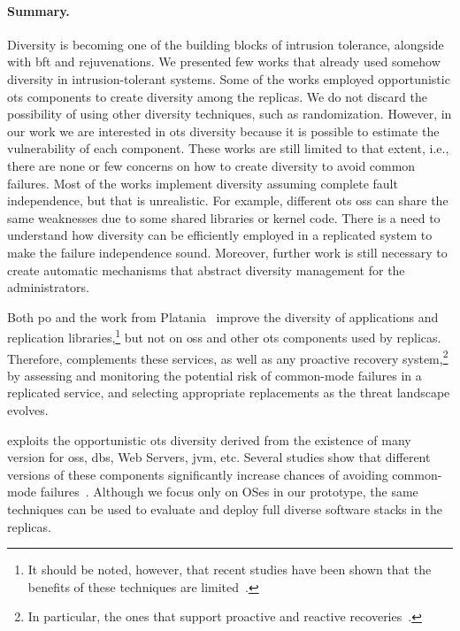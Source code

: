 \paragraph{Summary.} 
Diversity is becoming one of the building blocks of intrusion tolerance, alongside with \gls{bft} and rejuvenations. 
We presented few works that already used somehow diversity in intrusion-tolerant systems. Some of the works employed opportunistic \gls{ots} components to create diversity among the replicas. 
We do not discard the possibility of using other diversity techniques, such as randomization. 
However, in our work we are interested in \gls{ots} diversity because it is possible to estimate the vulnerability of each component. 
These works are still limited to that extent, i.e., there are none or few concerns on how to create diversity to avoid common failures. 
Most of the works implement diversity assuming complete fault independence, but that is unrealistic. 
For example, different \gls{ots} \glspl{os} can share the same weaknesses due to some shared libraries or kernel code. 
There is a need to understand how diversity can be efficiently employed in a replicated system to make the failure independence sound. 
Moreover, further work is still necessary to create automatic mechanisms that abstract diversity management for the administrators.

Both \gls{po} and the work from Platania~\etal{} improve the diversity of applications and replication libraries,\footnote{It should be noted, however, that recent studies have been shown that the benefits of these techniques are limited~\cite{Snow:2013,Bittau:2014}.} but not on \glspl{os} and other \gls{ots} components used by replicas.
Therefore, \system complements these services, as well as any proactive recovery system,\footnote{In particular, the ones that support proactive and reactive recoveries~\cite{Sousa:2010}.} by assessing and monitoring the potential risk of common-mode failures in a replicated service, and selecting appropriate replacements as the threat landscape evolves.

\system exploits the opportunistic \gls{ots} diversity derived from the existence of many version for \glspl{os}, \glspl{db}, Web Servers, \gls{jvm}, etc.
Several studies show that different versions of these components significantly increase chances of avoiding common-mode failures~\cite{Gashi:2007,Garcia:2014,Gorbenko:2011}.
Although we focus only on OSes in our \system prototype, the same techniques can be used to evaluate and deploy full diverse software stacks in the replicas.

